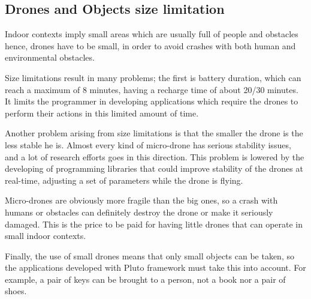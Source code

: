 \subsection{Drones and Objects size limitation}

Indoor contexts imply small areas which are usually full of people and obstacles hence, drones have to be small, in order to avoid crashes with both human and environmental obstacles.

Size limitations result in many problems; the first is battery duration, which can reach a maximum of 8 minutes, having a recharge time of about 20/30 minutes.
It limits the programmer in developing applications which require the drones to perform their actions in this limited amount of time.

Another problem arising from size limitations is that the smaller the drone is the less stable he is.
Almost every kind of micro-drone has serious stability issues, and a lot of research efforts goes in this direction. This problem is lowered by the developing of programming libraries that could improve stability of the drones at real-time, adjusting a set of parameters while the drone is flying.

Micro-drones are obviously more fragile than the big ones, so a crash with humans or obstacles can definitely destroy the drone or make it seriously damaged. This is the price to be paid for having little drones that can operate in small indoor contexts.

Finally, the use of small drones means that only small objects can be taken, so the applications developed with Pluto framework must take this into account.
For example, a pair of keys can be brought to a person, not a book nor a pair of shoes. 







